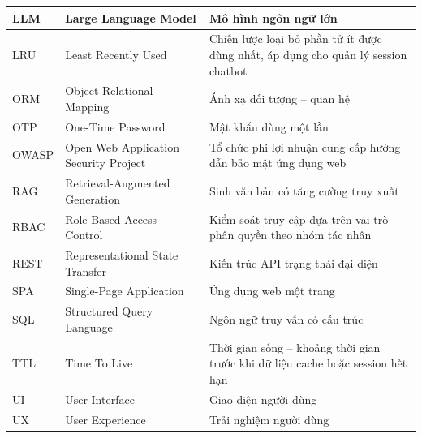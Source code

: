 \begin{longtable}{|m{2.0cm}|m{5.4cm}|m{6.3cm}|}
LLM & Large Language Model & Mô hình ngôn ngữ lớn \\    \hline
LRU & Least Recently Used & Chiến lược loại bỏ phần tử ít được dùng nhất, áp dụng cho quản lý session chatbot \\    \hline
ORM & Object-Relational Mapping & Ánh xạ đối tượng -- quan hệ \\    \hline
OTP & One-Time Password & Mật khẩu dùng một lần \\    \hline
OWASP & Open Web Application Security Project & Tổ chức phi lợi nhuận cung cấp hướng dẫn bảo mật ứng dụng web \\    \hline
RAG & Retrieval-Augmented Generation & Sinh văn bản có tăng cường truy xuất \\    \hline
RBAC & Role-Based Access Control & Kiểm soát truy cập dựa trên vai trò -- phân quyền theo nhóm tác nhân \\    \hline
REST & Representational State Transfer & Kiến trúc API trạng thái đại diện \\    \hline
SPA & Single-Page Application & Ứng dụng web một trang \\    \hline
SQL & Structured Query Language & Ngôn ngữ truy vấn có cấu trúc \\    \hline
TTL & Time To Live & Thời gian sống -- khoảng thời gian trước khi dữ liệu cache hoặc session hết hạn \\    \hline
UI & User Interface & Giao diện người dùng \\    \hline
UX & User Experience & Trải nghiệm người dùng \\    \hline
\end{longtable}
